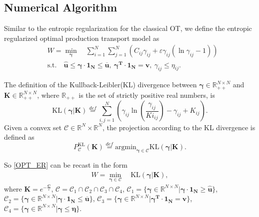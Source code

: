 \documentclass[review,hidelinks,onefignum,onetabnum]{siamart220329}
\begin{document}
\subsection{Numerical Algorithm}
Similar to the entropic regularization for the classical OT, we define the  entropic regularized optimal production transport model as
\begin{equation}\label{OPT_ER}
    \begin{aligned}
		&W= \min_{\bm{\gamma}} \quad \sum_{i=1}^{N}\sum_{j=1}^{N} (C_{ij} \gamma_{ij}+\varepsilon \gamma_{ij}(\ln \gamma_{ij}-1))\\
  		&\mathrm{s.t.}\quad  \bm{\hat{u}}\leq \bm{\gamma}\cdot \bm{1_{N}} \leq \bm{\overline{u}}, \ \bm{\gamma^{T}}\cdot \bm{1_{N}}=\bm{v},\ 
		\gamma_{ij}\leq \eta_{ij} .
\end{aligned}
\end{equation}

The definition of the Kullback-Leibler(KL) divergence between $\bm{\gamma}\in \mathbb{R}_{++}^{N\times N}$ and $\bm{K}\in \mathbb{R}_{++}^{N\times N}$, where $\mathbb{R}_{++}$ is the set of strictly positive real numbers, is
\begin{equation}
    \mathrm{KL}(\bm{\gamma}|\bm{K})\overset{def}{=} \sum_{i,j=1}^{N} (\gamma_{ij} \ln (\frac{\gamma_{ij}}{Ki_{ij}})-\gamma_{ij}+K_{ij}).
\end{equation}
Given a convex set $\mathcal{C}\in\mathbb{R}^{N}\times \mathbb{R}^N$, the projection according to the KL divergence is defined as
\begin{equation}
   P_{\mathcal{C}}^{\mathrm{KL}}(\bm{K})\overset{def}{=}\mathrm{argmin}_{\bm{\gamma}\in \mathcal{C}} \mathrm{KL}(\bm{\gamma}|\bm{K}).
\end{equation}

So \cref{OPT_ER} can be recast in the form
\begin{align}
		W= \min_{\bm{\gamma}\in \mathcal{C}} \quad \mathrm{KL}(\bm{\gamma}|\bm{K}),
\end{align}
where $\bm{K}=e^{-\frac{\bm{C}}{\varepsilon}}$, $\mathcal{C}=\mathcal{C}_1\cap \mathcal{C}_2  \cap \mathcal{C}_3 \cap \mathcal{C}_4$, $\mathcal{C}_1=\{\bm{\gamma}\in \mathbb{R}^{N\times N}|\bm{\gamma}\cdot \bm{1_{N}}\geq \bm{\hat{u}}\}$, $\mathcal{C}_2=\{\bm{\gamma}\in \mathbb{R}^{N\times N}|\bm{\gamma}\cdot \bm{1_{N}}\leq \bm{\overline{u}}\} $, $\mathcal{C}_3=\{\bm{\gamma}\in \mathbb{R}^{N\times N}| \bm{\gamma^{T}}\cdot \bm{1_{N}} = \bm{v} \}$, $\mathcal{C}_4=\{\bm{\gamma}\in \mathbb{R}^{N\times N}| \bm{\gamma}\leq \bm{\eta} \}$.
\end{document}
